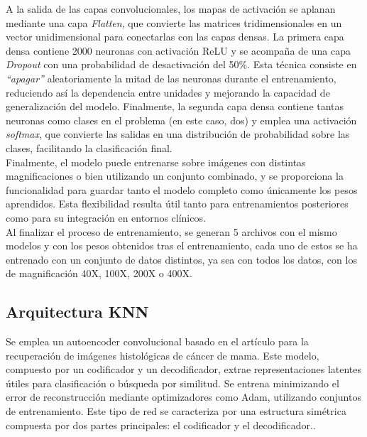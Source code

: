 \documentclass[12pt]{article} %
\begin{document}
A la salida de las capas convolucionales, los mapas de activación se aplanan mediante una capa \textit{Flatten}, que convierte las matrices tridimensionales en un vector unidimensional para conectarlas con las capas densas. La primera capa densa contiene 2000 neuronas con activación ReLU y se acompaña de una capa \textit{Dropout} con una probabilidad de desactivación del 50\%. Esta técnica consiste en \textit{“apagar”} aleatoriamente la mitad de las neuronas durante el entrenamiento, reduciendo así la dependencia entre unidades y mejorando la capacidad de generalización del modelo. Finalmente, la segunda capa densa contiene tantas neuronas como clases en el problema (en este caso, dos) y emplea una activación \textit{softmax}, que convierte las salidas en una distribución de probabilidad sobre las clases, facilitando la clasificación final.\\

Finalmente, el modelo puede entrenarse sobre imágenes con distintas magnificaciones o bien utilizando un conjunto combinado, y se proporciona la funcionalidad para guardar tanto el modelo completo como únicamente los pesos aprendidos. Esta flexibilidad resulta útil tanto para entrenamientos posteriores como para su integración en entornos clínicos.\\

Al finalizar el proceso de entrenamiento, se generan 5 archivos con el mismo modelos y con los pesos obtenidos tras el entrenamiento, cada uno de estos se ha entrenado con un conjunto de datos distintos, ya sea con todos los datos, con los de magnificación 40X, 100X, 200X o 400X. 

\subsection{Arquitectura KNN}
Se emplea un autoencoder convolucional basado en el artículo \cite{minarno2021cnn} para la recuperación de imágenes histológicas de cáncer de mama. Este modelo, compuesto por un codificador y un decodificador, extrae representaciones latentes útiles para clasificación o búsqueda por similitud. Se entrena minimizando el error de reconstrucción mediante optimizadores como Adam, utilizando conjuntos de entrenamiento. Este tipo de red se caracteriza por una estructura simétrica compuesta por dos partes principales: el codificador y el decodificador.. \\
\end{document}
